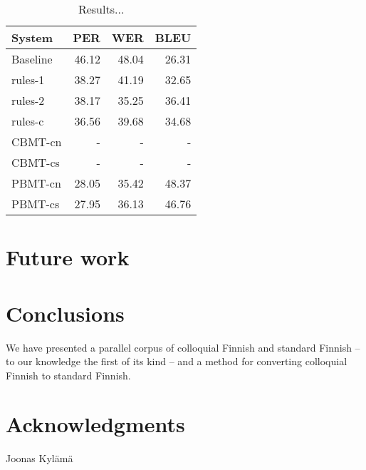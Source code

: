 \documentclass[11pt]{article}
\begin{document}
\begin{table}
  \centering
  \begin{tabular}{|l|r|r|r|}
     \hline
    \textbf{System} & \textbf{PER} & \textbf{WER} & \textbf{BLEU} \\
     \hline
     Baseline & 46.12 & 48.04 & 26.31 \\
     \hline
     rules-1 & 38.27 & 41.19 & 32.65 \\
     rules-2 & 38.17 & 35.25 & 36.41 \\
     rules-c & 36.56 & 39.68 & 34.68 \\
     \hline
     CBMT-cn & - & - & - \\
     CBMT-cs & - & - & - \\
     PBMT-cn & 28.05 & 35.42 & 48.37 \\
     PBMT-cs & 27.95 & 36.13 & 46.76 \\
     \hline
  \end{tabular}
  \label{table:results}
  \caption{Results...}
\end{table}

\section{Future work}

% 

\section{Conclusions}

We have presented a parallel corpus of colloquial Finnish and standard Finnish --
to our knowledge the first of its kind -- and a method for converting colloquial
Finnish to standard Finnish.


\section*{Acknowledgments}

Joonas Kyl\"{a}m\"{a}



\end{document}
